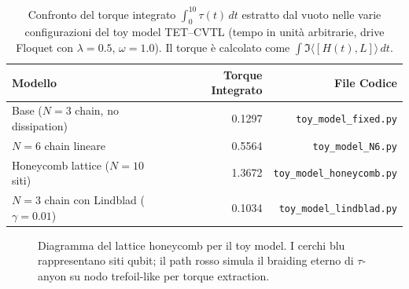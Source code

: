 \documentclass[11pt,a4paper]{article}
\theoremstyle{plain}
\theoremstyle{definition}
\begin{document}
\begin{table}[H]
\centering
\caption{Confronto del torque integrato $\int_0^{10} \tau(t) \, dt$ estratto dal vuoto nelle varie configurazioni del toy model TET--CVTL (tempo in unità arbitrarie, drive Floquet con $\lambda=0.5$, $\omega=1.0$). Il torque è calcolato come $\int \Im \langle [H(t), L] \rangle \, dt$.}
\label{tab:torque-comparison}
\begin{tabular}{lrr}
\toprule
Modello & Torque Integrato & File Codice \\
\midrule
Base ($N=3$ chain, no dissipation) & 0.1297 & \texttt{toy\_model\_fixed.py} \\
$N=6$ chain lineare & 0.5564 & \texttt{toy\_model\_N6.py} \\
Honeycomb lattice ($N=10$ siti) & 1.3672 & \texttt{toy\_model\_honeycomb.py} \\
$N=3$ chain con Lindblad ($\gamma=0.01$) & 0.1034 & \texttt{toy\_model\_lindblad.py} \\
\bottomrule
\end{tabular}
\end{table}




\vspace{0.3cm}



\begin{figure}[h]
\centering
{}
\caption{Diagramma del lattice honeycomb per il toy model. I cerchi blu rappresentano siti qubit; il path rosso simula il braiding eterno di $\tau$-anyon su nodo trefoil-like per torque extraction.}
\label{fig:lattice-toy}
\end{figure}
\end{document}
